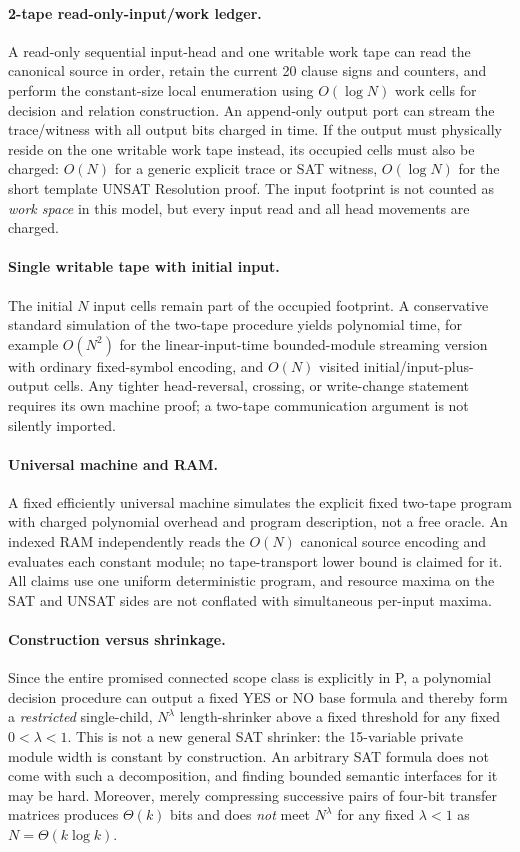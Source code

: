 \documentclass[11pt]{article}
\begin{document}
\paragraph{2-tape read-only-input/work ledger.} A read-only sequential input-head and one writable work tape can read the canonical source in order, retain the current 20 clause signs and counters, and perform the constant-size local enumeration using $O(\log N)$ work cells for decision and relation construction. An append-only output port can stream the trace/witness with all output bits charged in time. If the output must physically reside on the one writable work tape instead, its occupied cells must also be charged: $O(N)$ for a generic explicit trace or SAT witness, $O(\log N)$ for the short template UNSAT Resolution proof. The input footprint is not counted as \emph{work space} in this model, but every input read and all head movements are charged.

\paragraph{Single writable tape with initial input.} The initial $N$ input cells remain part of the occupied footprint. A conservative standard simulation of the two-tape procedure yields polynomial time, for example $O(N^2)$ for the linear-input-time bounded-module streaming version with ordinary fixed-symbol encoding, and $O(N)$ visited initial/input-plus-output cells. Any tighter head-reversal, crossing, or write-change statement requires its own machine proof; a two-tape communication argument is not silently imported.

\paragraph{Universal machine and RAM.} A fixed efficiently universal machine simulates the explicit fixed two-tape program with charged polynomial overhead and program description, not a free oracle. An indexed RAM independently reads the $O(N)$ canonical source encoding and evaluates each constant module; no tape-transport lower bound is claimed for it. All claims use one uniform deterministic program, and resource maxima on the SAT and UNSAT sides are not conflated with simultaneous per-input maxima.

\paragraph{Construction versus shrinkage.} Since the entire promised connected scope class is explicitly in P, a polynomial decision procedure can output a fixed YES or NO base formula and thereby form a \emph{restricted} single-child, $N^\lambda$ length-shrinker above a fixed threshold for any fixed $0<\lambda<1$. This is not a new general SAT shrinker: the 15-variable private module width is constant by construction. An arbitrary SAT formula does not come with such a decomposition, and finding bounded semantic interfaces for it may be hard. Moreover, merely compressing successive pairs of four-bit transfer matrices produces $\Theta(k)$ bits and does \emph{not} meet $N^\lambda$ for any fixed $\lambda<1$ as $N=\Theta(k\log k)$.
\end{document}
